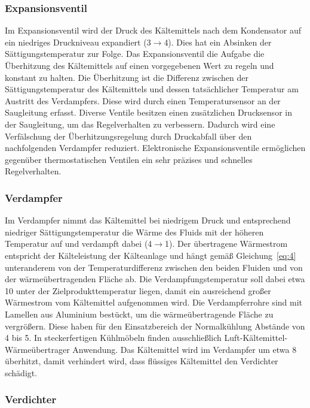 \subsubsection{Expansionsventil}
\label{subsubsec:Expansionsventil}


Im Expansionsventil wird der Druck des Kältemittels nach dem Kondensator auf ein niedriges Druckniveau expandiert (3$\longrightarrow$4). Dies hat ein Absinken der Sättigungstemperatur zur Folge. Das Expansionsventil die Aufgabe die Überhitzung des Kältemittels auf einen vorgegebenen Wert zu regeln und konstant zu halten. Die Überhitzung ist die Differenz zwischen der Sättigungstemperatur des Kältemittels und dessen tatsächlicher Temperatur am Austritt des Verdampfers. Diese wird durch einen Temperatursensor an der Saugleitung erfasst. Diverse Ventile besitzen einen zusätzlichen Drucksensor in der Saugleitung, um das Regelverhalten zu verbessern. Dadurch wird eine Verfälschung der Überhitzungsregelung durch Druckabfall über den nachfolgenden Verdampfer reduziert. Elektronische Expansionsventile ermöglichen gegenüber thermostatischen Ventilen ein sehr präzises und schnelles Regelverhalten. 

\subsubsection{Verdampfer}
\label{subsubsec:Verdampfer}

Im Verdampfer nimmt das Kältemittel bei niedrigem Druck und entsprechend niedriger Sättigungstemperatur die Wärme des Fluids mit der höheren Temperatur auf und verdampft dabei (4$\longrightarrow$1). Der übertragene Wärmestrom entspricht der Kälteleistung der Kälteanlage und hängt gemäß Gleichung~\ref{eq:4} unteranderem von der Temperaturdifferenz zwischen den beiden Fluiden und von der wärmeübertragenden Fläche ab. Die Verdampfungstemperatur soll dabei etwa \unit{10}{\kelvin} unter der Zielprodukttemperatur liegen, damit ein ausreichend großer Wärmestrom vom Kältemittel aufgenommen wird. Die Verdampferrohre sind mit Lamellen aus Aluminium bestückt, um die wärmeübertragende Fläche zu vergrößern. Diese haben für den Einsatzbereich der Normalkühlung Abstände von \unit{4}{\milli\metre} bis \unit{5}{\milli\metre}. In steckerfertigen Kühlmöbeln finden ausschließlich Luft-Kältemittel-Wärmeübertrager Anwendung. Das Kältemittel wird im Verdampfer um etwa \unit{8}{\kelvin} überhitzt, damit verhindert wird, dass flüssiges Kältemittel den Verdichter schädigt.

\subsubsection{Verdichter}
\label{subsubsec:Verdichter}

